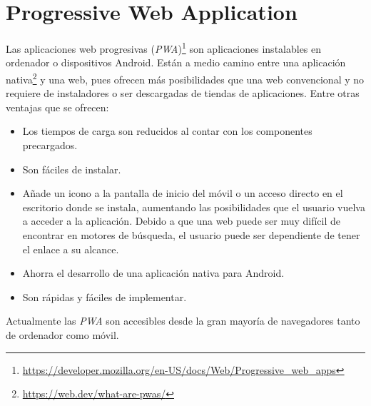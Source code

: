 \section{Progressive Web Application}
\label{cap3:sec:pwa}

Las aplicaciones web progresivas (\textit{PWA})\footnote{\url{https://developer.mozilla.org/en-US/docs/Web/Progressive_web_apps}} son aplicaciones instalables en ordenador o dispositivos Android. Están a medio camino entre una aplicación nativa\footnote{\url{https://web.dev/what-are-pwas/}} y una web, pues ofrecen más posibilidades que una web convencional y no requiere de instaladores o ser descargadas de tiendas de aplicaciones.
Entre otras ventajas que se ofrecen:

\begin{itemize}
	\item Los tiempos de carga son reducidos al contar con los componentes precargados.
	
	
	\item Son fáciles de instalar.
	
	\item Añade un icono a la pantalla de inicio del móvil o un acceso directo en el escritorio donde se instala, aumentando las posibilidades que el usuario vuelva a acceder a la aplicación. Debido a que una web puede ser muy difícil de encontrar en motores de búsqueda, el usuario puede ser dependiente de tener el enlace a su alcance.
	
	\item Ahorra el desarrollo de una aplicación nativa para Android. 
	
	\item Son rápidas y fáciles de implementar.
	
\end{itemize}

Actualmente las \textit{PWA} son accesibles desde la gran mayoría de navegadores tanto de ordenador como móvil.






